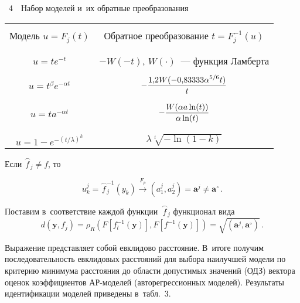\begin{multicols}{2}

\addtocounter{table}{1}

\begin{center}
\noindent
\parbox{231pt}{{{\tablename~4}\ \ 
\small{Набор моделей и~их обратные преобразования}}
}

\vspace*{6pt}

{\small 
\tabcolsep=1pt
\begin{tabular}{|c|c|}
\hline
&\\[-9pt]
Модель $u=F_j(t)$ &Обратное преобразование $t=F_j^{-1}(u)$\\
&\\[-9pt]
\hline
&\\[-9pt]
$u=te^{-t}$&$-W(-t)$, $W(\cdot)$~--- функция Ламберта\\
\hline
&\\[-9pt]
$u=t^\beta e^{-\alpha t}$&$\displaystyle -\displaystyle\frac{\displaystyle 1{,}2W(-0{,}83333\alpha^{5/6} t)\mathstrut}{\displaystyle t\mathstrut}$\\
\hline
&\\[-9pt]
$u=ta^{-\alpha t}$&$\displaystyle -\displaystyle\frac{\displaystyle W(\alpha a \ln(t))\mathstrut}{\displaystyle \alpha\ln(t)\mathstrut}$ \\
&\\[-9pt]
\hline
&\\[-9pt]
$u=1-e^{-(t/\lambda)^k}$&$\lambda \sqrt[t]{-\ln (1-k)}$ \\
\hline
\end{tabular}
}
\end{center}

\vspace*{3pt}



  
  Если $\overset{\smallfrown}{f}_j\not= f$, то 
  
  \noindent
  $$
  u_k^j= \overset{\smallfrown}{f}_j^{-
1}(y_k)\overset{F_p}{\to} \left( a_1^j, a_2^j\right) = \mathbf{a}^j\not= 
\mathbf{a}^\circ\,.
$$

\vspace*{-9pt}
  
  Поставим в~соответствие каждой функции~$\overset{\smallfrown}{f}_j$ 
функционал вида
  $$
  d(\mathbf{y},f_j) =
  \rho_{{R}} \left( F\left[ f_l^{-1}(\mathbf{y})\right]\!,
 F\left[ f^{-1}(\mathbf{y})\right]\right) =
\sqrt{\left( \mathbf{a}^j, \mathbf{a}^\circ\right)}\,.
  $$ 
  
  Выражение представляет собой евклидово расстояние. В~итоге получим 
последовательность евклидовых расстояний для выбора наилучшей модели по 
критерию минимума расстояния до области допустимых значений (ОДЗ) 
вектора оценок коэффициентов АР-мо\-де\-лей (авторегрессионных моделей). 
Результаты идентификации моделей приведены в~табл.~3.



\end{multicols}
